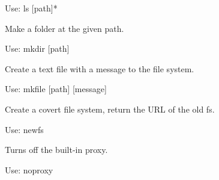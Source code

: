 \documentclass[letterpaper,12pt,openany,oneside]{sphinxmanual}
\begin{document}
\begin{fulllineitems}
\begin{fulllineitems}
Use: ls {[}path{]}*

\end{fulllineitems}


\begin{fulllineitems}
\label{console:covertFS.console.Console.do_mkdir}
Make a folder at the given path.

Use: mkdir {[}path{]}

\end{fulllineitems}


\begin{fulllineitems}
\label{console:covertFS.console.Console.do_mkfile}
Create a text file with a message to the file system.

Use: mkfile {[}path{]} {[}message{]}

\end{fulllineitems}


\begin{fulllineitems}
\label{console:covertFS.console.Console.do_mount}
\end{fulllineitems}


\begin{fulllineitems}
\label{console:covertFS.console.Console.do_newfs}
Create a covert file system, return the URL of the old fs.

Use: newfs

\end{fulllineitems}


\begin{fulllineitems}
\label{console:covertFS.console.Console.do_noproxy}
Turns off the built-in proxy.

Use: noproxy

\end{fulllineitems}


\end{fulllineitems}
\end{document}
